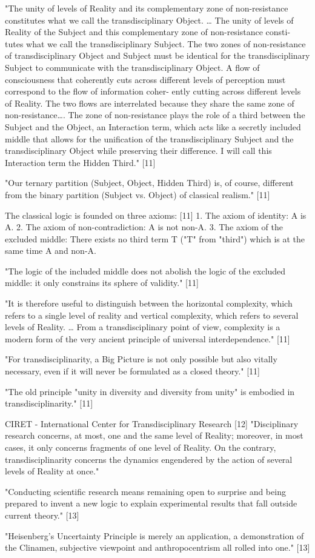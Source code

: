 "The unity of levels of Reality and its complementary zone of non-resistance constitutes what we call the transdisciplinary Object. … The unity of levels of Reality of the Subject and this complementary zone of non-resistance consti- tutes what we call the transdisciplinary Subject. The two zones of non-resistance of transdisciplinary Object and Subject must be identical for the transdisciplinary Subject to communicate with the transdisciplinary Object. A flow of consciousness that coherently cuts across different levels of perception must correspond to the flow of information coher- ently cutting across different levels of Reality. The two flows are interrelated because they share the same zone of non-resistance…. The zone of non-resistance plays the role of a third between the Subject and the Object, an Interaction term, which acts like a secretly included middle that allows for the unification of the transdisciplinary Subject and the transdisciplinary Object while preserving their difference. I will call this Interaction term the Hidden Third." [11]

"Our ternary partition (Subject, Object, Hidden Third) is, of course, different from the binary partition (Subject vs. Object) of classical realism." [11]

The classical logic is founded on three axioms: [11]
1.	The axiom of identity: A is A.
2.	The axiom of non-contradiction: A is not non-A.
3.	The axiom of the excluded middle: There exists no third term T ("T" from "third") which is at the same time A and non-A.

"The logic of the included middle does not abolish the logic of the excluded middle: it only constrains its sphere of validity." [11]

"It is therefore useful to distinguish between the horizontal complexity, which refers to a single level of reality and vertical complexity, which refers to several levels of Reality. … From a transdisciplinary point of view, complexity is a modern form of the very ancient principle of universal interdependence." [11]

"For transdisciplinarity, a Big Picture is not only possible but also vitally necessary, even if it will never be formulated as a closed theory." [11]

"The old principle "unity in diversity and diversity from unity" is embodied in transdisciplinarity." [11]

CIRET - International Center for Transdisciplinary Research [12]
"Disciplinary research concerns, at most, one and the same level of Reality; moreover, in most cases, it only concerns fragments of one level of Reality. On the contrary, transdisciplinarity concerns the dynamics engendered by the action of several levels of Reality at once."

"Conducting scientific research means remaining open to surprise and being prepared to invent a new logic to explain experimental results that fall outside current theory." [13]

"Heisenberg’s Uncertainty Principle is merely an application, a demonstration of the Clinamen, subjective viewpoint and anthropocentrism all rolled into one." [13]
